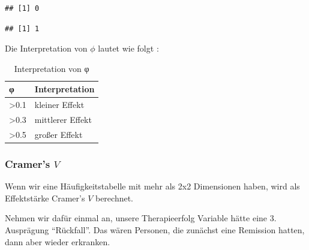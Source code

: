 \documentclass[
]{book}
\newenvironment{Shaded}{\begin{snugshade}}{\end{snugshade}}
\newcommand{\FunctionTok}[1]{\textcolor[rgb]{0.00,0.00,0.00}{#1}}
\newcommand{\NormalTok}[1]{#1}
\newcommand{\SpecialCharTok}[1]{\textcolor[rgb]{0.00,0.00,0.00}{#1}}
\begin{document}
\begin{verbatim}
## [1] 0
\end{verbatim}

\begin{Shaded}
\end{Shaded}

\begin{verbatim}
## [1] 1
\end{verbatim}

Die Interpretation von \(\phi\) lautet wie folgt \citet{cohen1988statistical}:

\begin{table}[tbp]

\begin{center}
\begin{threeparttable}

\caption{\label{tab:unnamed-chunk-292}Interpretation von φ}

\begin{tabular}{ll}
\toprule
φ & \multicolumn{1}{c}{Interpretation}\\
\midrule
>0.1 & kleiner Effekt\\
>0.3 & mittlerer Effekt\\
>0.5 & großer Effekt\\
\bottomrule
\end{tabular}

\end{threeparttable}
\end{center}

\end{table}

\hypertarget{cramers-v}{%
\subsubsection{\texorpdfstring{Cramer's \(V\)}{Cramer's V}}\label{cramers-v}}

Wenn wir eine Häufigkeitstabelle mit mehr als 2x2 Dimensionen haben, wird als Effektstärke Cramer's \(V\) berechnet.

Nehmen wir dafür einmal an, unsere Therapieerfolg Variable hätte eine 3. Ausprägung ``Rückfall''. Das wären Personen, die zunächst eine Remission hatten, dann aber wieder erkranken.
\end{document}
